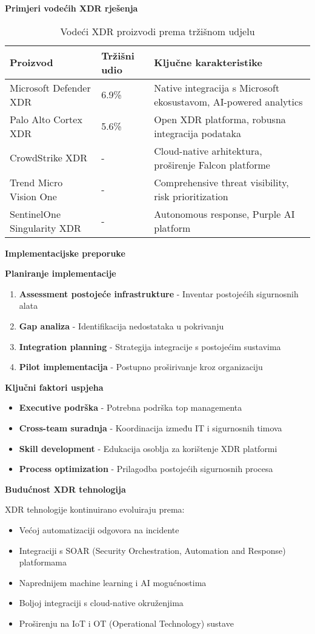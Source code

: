 \textbf{Primjeri vodećih XDR rješenja}

\begin{table}[h]
\centering
\begin{tabular}{|l|p{3cm}|p{5cm}|}
\hline
\textbf{Proizvod} & \textbf{Tržišni udio} & \textbf{Ključne karakteristike} \\
\hline
Microsoft Defender XDR & 6.9\% & Native integracija s Microsoft ekosustavom, AI-powered analytics \\
\hline
Palo Alto Cortex XDR & 5.6\% & Open XDR platforma, robusna integracija podataka \\
\hline
CrowdStrike XDR & - & Cloud-native arhitektura, proširenje Falcon platforme \\
\hline
Trend Micro Vision One & - & Comprehensive threat visibility, risk prioritization \\
\hline
SentinelOne Singularity XDR & - & Autonomous response, Purple AI platform \\
\hline
\end{tabular}
\caption{Vodeći XDR proizvodi prema tržišnom udjelu}
\end{table}

\textbf{Implementacijske preporuke}

\textbf{Planiranje implementacije}
\begin{enumerate}
\item \textbf{Assessment postojeće infrastrukture} - Inventar postojećih sigurnosnih alata
\item \textbf{Gap analiza} - Identifikacija nedostataka u pokrivanju
\item \textbf{Integration planning} - Strategija integracije s postojećim sustavima
\item \textbf{Pilot implementacija} - Postupno proširivanje kroz organizaciju
\end{enumerate}

\textbf{Ključni faktori uspjeha}
\begin{itemize}
\item \textbf{Executive podrška} - Potrebna podrška top managementa
\item \textbf{Cross-team suradnja} - Koordinacija između IT i sigurnosnih timova
\item \textbf{Skill development} - Edukacija osoblja za korištenje XDR platformi
\item \textbf{Process optimization} - Prilagodba postojećih sigurnosnih procesa
\end{itemize}

\textbf{Budućnost XDR tehnologija}

XDR tehnologije kontinuirano evoluiraju prema:
\begin{itemize}
\item Većoj automatizaciji odgovora na incidente
\item Integraciji s SOAR (Security Orchestration, Automation and Response) platformama
\item Naprednijem machine learning i AI mogućnostima
\item Boljoj integraciji s cloud-native okruženjima
\item Proširenju na IoT i OT (Operational Technology) sustave
\end{itemize}